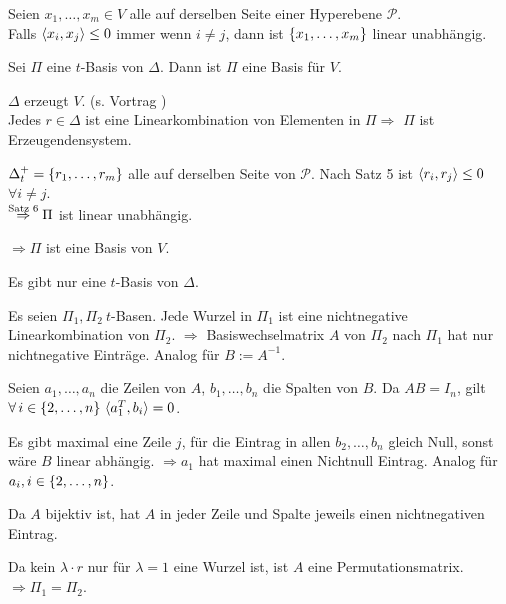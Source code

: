 \documentclass{handout}
\begin{document}
\begin{satz}
    Seien \( x_1, \ldots, x_m \in V \) alle auf derselben 
    Seite einer Hyperebene \( \mathscr{P} \). \\
    Falls \( \langle x_i, x_j \rangle \leq 0 \) immer wenn 
    \( i \neq j \), dann ist \( \{x_1, \ldots, x_m\} \) 
    linear unabhängig.
\end{satz} 

\begin{satz}
    Sei \( \Pi \) eine \(t\)-Basis von \( \Delta \). Dann ist 
    \( \Pi \) eine Basis für \( V \).
\end{satz}
\begin{bew}
    \( \Delta \) erzeugt \( V \). (s. Vortrag )\\
    Jedes \( r \in \Delta \) ist eine Linearkombination von 
    Elementen in \( \Pi \Rightarrow \) \( \Pi \) ist Erzeugendensystem.

    \( \Delta_t^+ = \{r_1, \ldots, r_m\} \) alle auf derselben Seite 
    von \( \mathscr{P} \). Nach Satz 5 ist \( \langle r_i, r_j \rangle \leq 0 \)
    \( \forall i \neq j \). \\\( \overset{\text{Satz 6}}{\Rightarrow} \Pi \) 
    ist linear unabhängig.

    \( \Rightarrow \Pi \) ist eine Basis von \(V\).
\end{bew}

\begin{satz}
    Es gibt nur eine \( t \)-Basis von \( \Delta \).
\end{satz}
\begin{bew}
    Es seien \( \Pi_1, \Pi_2\ t \)-Basen. Jede Wurzel in \( \Pi_1 \) ist eine nichtnegative 
    Linearkombination von \( \Pi_2 \). \( \Rightarrow \) Basiswechselmatrix \(A\) von 
    \( \Pi_2 \) nach \( \Pi_1 \) hat nur nichtnegative Einträge. Analog für \( B := A^{-1} \).

    Seien \( a_1, \ldots, a_n \) die Zeilen von \(A\), \( b_1, \ldots, b_n \) die Spalten von \(B\).
    Da \( AB = I_n \), gilt \( \forall i \in \set{2, \ldots, n}\ \scalarprod{a_1^T}{b_i} = 0 \).

    Es gibt maximal eine Zeile \( j \), für die Eintrag in allen 
    \( b_2, \ldots, b_n \) gleich Null, sonst wäre 
    \(B\) linear abhängig. \( \Rightarrow a_1 \) hat maximal einen 
    Nichtnull Eintrag. Analog für \( a_i, i \in \{2, \ldots, n\} \).

    Da \(A\) bijektiv ist, hat \(A\) in jeder Zeile und 
    Spalte jeweils einen nichtnegativen Eintrag.

    Da kein \( \lambda \cdot r \) nur für 
    \( \lambda = 1 \) eine Wurzel ist, 
    ist \( A \) eine Permutationsmatrix.
    \( \Rightarrow \Pi_1 = \Pi_2 \).
\end{bew}
\end{document}
